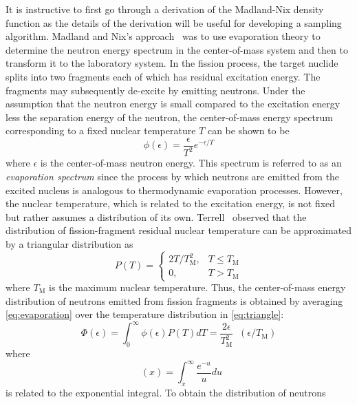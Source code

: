 \documentclass[3p,fleqn]{elsarticle}
\DeclareMathOperator\expint{E_1}
\newcommand{\tmax}{T_{\mathrm{M}}}
\begin{document}
It is instructive to first go through a derivation of the Madland-Nix
density function as the details of the derivation will be useful for
developing a sampling algorithm. Madland and Nix's
approach~\cite{nse-madland-1982} was to use evaporation theory to determine the
neutron energy spectrum in the center-of-mass system and then to transform it to
the laboratory system. In the fission process, the target nuclide splits into
two fragments each of which has residual excitation energy. The fragments may
subsequently de-excite by emitting neutrons. Under the assumption that the
neutron energy is small compared to the excitation energy less the separation
energy of the neutron, the center-of-mass energy spectrum corresponding to a
fixed nuclear temperature $T$ can be shown to be~\cite{physrev-weisskopf-1937}
\begin{equation}
  \phi(\epsilon) = \frac{\epsilon}{T^2} e^{-\epsilon/T}
  \label{eq:evaporation}
\end{equation}
where $\epsilon$ is the center-of-mass neutron energy. This spectrum is referred
to as an \textit{evaporation spectrum} since the process by which neutrons are
emitted from the excited nucleus is analogous to thermodynamic evaporation
processes. However, the nuclear temperature, which is related to the excitation
energy, is not fixed but rather assumes a distribution of its
own. Terrell~\cite{physrev-terrell-1959} observed that the distribution of
fission-fragment residual nuclear temperature can be approximated by a
triangular distribution as
\begin{equation}
  P(T) = \begin{cases} 2T/\tmax^2, & T \le \tmax \\ 0, & T > \tmax \end{cases}
  \label{eq:triangle}
\end{equation}
where $\tmax$ is the maximum nuclear temperature. Thus, the center-of-mass energy
distribution of neutrons emitted from fission fragments is obtained by averaging
\autoref{eq:evaporation} over the temperature distribution in \autoref{eq:triangle}:
\begin{equation}
  \Phi(\epsilon) = \int_0^\infty \phi(\epsilon) P(T) dT =
  \frac{2\epsilon}{\tmax^2} \expint ( \epsilon/\tmax )
  \label{eq:com}
\end{equation}
where
\begin{equation*}
  \expint(x) = \int_x^\infty \frac{e^{-u}}{u} du
\end{equation*}
is related to the exponential integral. To obtain the distribution of neutrons
\end{document}

